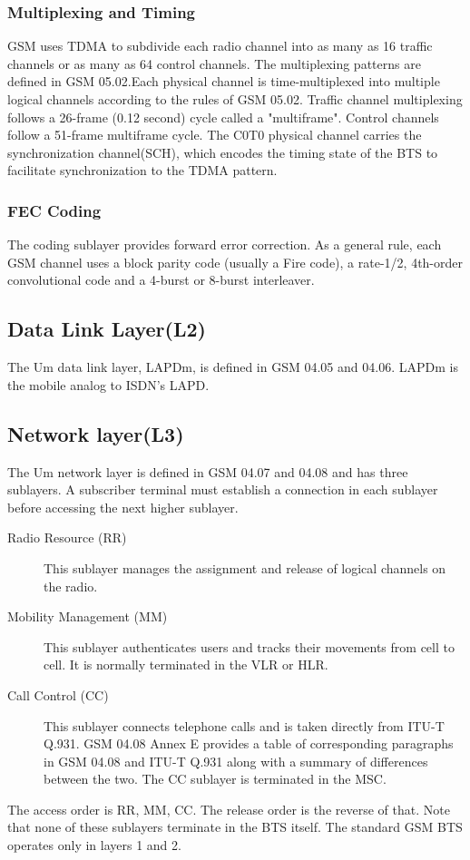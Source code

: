 	
\subsubsection*{Multiplexing and Timing}
GSM uses TDMA to subdivide each
radio channel into as many as 16 traffic channels or as many as 64 control 
channels. The multiplexing patterns are defined in GSM 05.02.Each physical
channel is time-multiplexed into multiple logical channels according to 
the rules of GSM 05.02. Traffic channel multiplexing follows a 26-frame
(0.12 second) cycle called a "multiframe". Control channels follow a 
51-frame multiframe cycle. The C0T0 physical channel carries the 
synchronization channel(SCH), which encodes the timing state of the 
BTS to facilitate synchronization to the TDMA pattern.
	
	
\subsubsection*{FEC Coding} The coding sublayer provides forward error 
correction. As a general rule, each GSM channel uses a block parity code
(usually a Fire code), a rate-1/2, 4th-order convolutional code and a 
4-burst or 8-burst interleaver.



\subsection{Data Link Layer(L2)}
The Um data link layer, LAPDm, is defined in GSM 04.05 and 04.06. 
LAPDm is the mobile analog to ISDN's LAPD.

\subsection{Network layer(L3)}
The Um network layer is defined in GSM 04.07 and 04.08 and has three sublayers.
A subscriber terminal must establish a connection in each sublayer before 
accessing the next higher sublayer.

\begin{description}
	\item[Radio Resource (RR)] This sublayer manages the assignment and 
release of logical channels on the radio.

	\item[Mobility Management (MM)] This sublayer authenticates users and 
tracks their movements from cell to cell. It is normally terminated in 
the VLR or HLR.

	\item[Call Control (CC)] This sublayer connects telephone calls and is 
taken directly from ITU-T Q.931. GSM 04.08 Annex E provides a table of 
corresponding paragraphs in GSM 04.08 and ITU-T Q.931 along with a summary
of differences between the two. The CC sublayer is terminated in the MSC.

\end{description}

The access order is RR, MM, CC. The release order is the reverse of that. 
Note that none of these sublayers terminate in the BTS itself. The standard 
GSM BTS operates only in layers 1 and 2.
